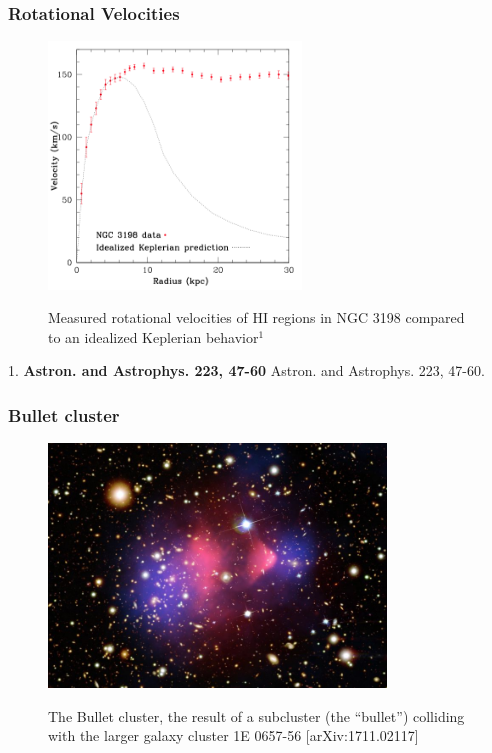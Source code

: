 \documentclass{beamer}
\begin{document}
\begin{frame}
\frametitle{Rotational Velocities}


\begin{figure}[!tbp]
\centering
\includegraphics[width=0.6\textwidth]{pictures/fig_Introduction_rotation_curve_1}\label{fig:f1}
\caption{{\scriptsize Measured rotational velocities of HI regions in NGC 3198 compared to an idealized Keplerian behavior$^1$}}
\end{figure}

\begin{spacing}{0.5}
	{\tiny
		1. \textbf{Astron. and Astrophys. 223, 47-60} Astron. and Astrophys. 223, 47-60.
	}
\end{spacing}


\end{frame}


\begin{frame}
\frametitle{Bullet cluster}


\begin{figure}[!tbp]
\centering
\includegraphics[width=0.8\textwidth]{pictures/bulletcluster}\label{fig:f2}
\caption{{\scriptsize The Bullet cluster, the result of a subcluster (the “bullet”) colliding with the larger galaxy cluster 1E 0657-56  [arXiv:1711.02117]}}
\end{figure}

\end{frame}
\end{document}
